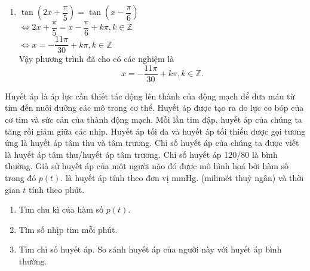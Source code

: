 \begin{bt}
{\begin{enumerate}
        $\Leftrightarrow \hoac{
            &x=k2\pi \\
            &x=k\dfrac{2\pi}{5}}\left(k\in \mathbb{Z}\right)$
        \item $ \tan\left(2x+\dfrac{\pi}{5}\right)= \tan\left(x-\dfrac{\pi}{6}\right)$\\
        $\Leftrightarrow 2x+\dfrac{\pi}{5}=x-\dfrac{\pi}{6}+k\pi,k\in \mathbb{Z}$\\
        $\Leftrightarrow x=-\dfrac{11\pi}{30}+k\pi,k\in \mathbb{Z}$\\
        Vậy phương trình đã cho có các nghiệm là  $$x=-\dfrac{11\pi}{30}+k\pi,k\in \mathbb{Z}.$$
    \end{enumerate}}
\end{bt}

\begin{bt}%
    Huyết áp là áp lực cần thiết tác động lên thành của động mạch để đưa máu từ tim đến nuôi dưỡng các mô trong cơ thể. Huyết áp được tạo ra do lực co bóp của cơ tim và sức cản của thành động mạch. Mỗi lần tim đập, huyết áp của chúng ta tăng rồi giảm giữa các nhịp. Huyết áp tối đa và huyết áp tối thiểu được gọi tương ứng là huyết áp tâm thu và tâm trương. Chỉ số huyết áp của chúng ta được viết là huyết áp tâm thu/huyết áp tâm trương. Chỉ số huyết áp 120/80 là bình thường. Giả sử huyết áp của một người nào đó được mô hình hoá bởi hàm số
    trong đó $p(t)$. là huyết áp tính theo đơn vị mmHg. (milimét thuỷ ngân) và thời gian $t$ tính theo phút.
    \begin{enumerate}
        \item Tìm chu kì của hàm số $p(t)$.
        \item Tìm số nhịp tim mỗi phút.
        \item Tìm chỉ số huyết áp. So sánh huyết áp của người này với huyết áp bình thường.
    \end{enumerate}
\end{bt}

